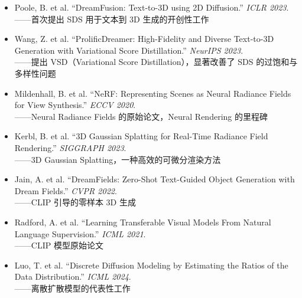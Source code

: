 \documentclass[a4paper]{article}
\begin{document}
\begin{itemize}
    \item Poole, B. et al. ``DreamFusion: Text-to-3D using 2D Diffusion.'' \textit{ICLR 2023}. \\
    ——首次提出 SDS 用于文本到 3D 生成的开创性工作

    \item Wang, Z. et al. ``ProlificDreamer: High-Fidelity and Diverse Text-to-3D Generation with Variational Score Distillation.'' \textit{NeurIPS 2023}. \\
    ——提出 VSD（Variational Score Distillation），显著改善了 SDS 的过饱和与多样性问题

    \item Mildenhall, B. et al. ``NeRF: Representing Scenes as Neural Radiance Fields for View Synthesis.'' \textit{ECCV 2020}. \\
    ——Neural Radiance Fields 的原始论文，Neural Rendering 的里程碑

    \item Kerbl, B. et al. ``3D Gaussian Splatting for Real-Time Radiance Field Rendering.'' \textit{SIGGRAPH 2023}. \\
    ——3D Gaussian Splatting，一种高效的可微分渲染方法

    \item Jain, A. et al. ``DreamFields: Zero-Shot Text-Guided Object Generation with Dream Fields.'' \textit{CVPR 2022}. \\
    ——CLIP 引导的零样本 3D 生成

    \item Radford, A. et al. ``Learning Transferable Visual Models From Natural Language Supervision.'' \textit{ICML 2021}. \\
    ——CLIP 模型原始论文

    \item Luo, T. et al. ``Discrete Diffusion Modeling by Estimating the Ratios of the Data Distribution.'' \textit{ICML 2024}. \\
    ——离散扩散模型的代表性工作
\end{itemize}

\end{document}
